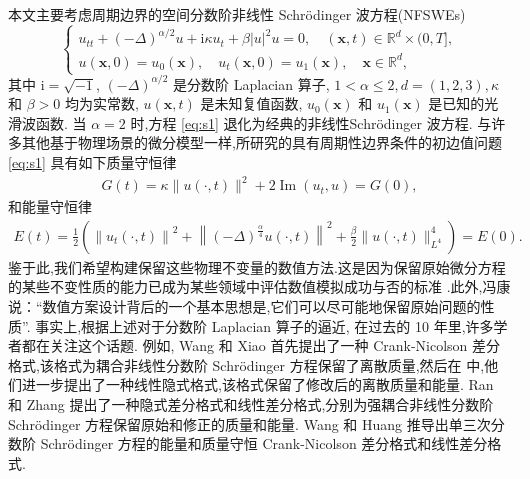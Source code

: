 本文主要考虑周期边界的空间分数阶非线性 Schr{\"o}dinger 波方程(NFSWEs)
\begin{equation}
    \left\{\begin{array}{l}
        u_{t t}+(-\Delta)^{\alpha / 2} u+\mathrm{i} \kappa u_{t}+\beta|u|^{2} u=0, \quad(\boldsymbol{x}, t) \in \mathbb{R}^d\times(0, T], \\
        u(\boldsymbol{x}, 0)=u_{0}(\boldsymbol{x}), \quad u_{t}(\boldsymbol{x}, 0)=u_{1}(\boldsymbol{x}), \quad \boldsymbol{x} \in \mathbb{R}^d,
    \end{array}\right.\label{eq:s1}
    \end{equation}
其中 $\mathrm{i}=\sqrt{-1}$, $(-\Delta)^{\alpha / 2}$ 是分数阶 Laplacian 算子, $1<\alpha \leq 2,d=(1,2,3), \kappa$ 和 $\beta>0$ 均为实常数, 
$u(\boldsymbol{x}, t)$ 是未知复值函数, $u_{0}(\boldsymbol{x})$ 和 $u_{1}(\boldsymbol{x})$ 是已知的光滑波函数. 
当 $\alpha=2$ 时,方程 \eqref{eq:s1} 退化为经典的非线性Schr{\"o}dinger 波方程. 与许多其他基于物理场景的微分模型一样,所研究的具有周期性边界条件的初边值问题 \eqref{eq:s1}  具有如下质量守恒律
\begin{align}\label{eq_8}
    G(t)=\kappa\|u(\cdot, t)\|^{2}+2\operatorname{Im}\left(u_{t}, u\right)=G(0),
    \end{align}
和能量守恒律
\begin{align}\label{eq_9}
    E(t)=\frac{1}{2}\left(\left\|u_{t}(\cdot, t)\right\|^{2}+\left\|(-\Delta)^{\frac{\alpha}{4}} u(\cdot, t)\right\|^{2}+\frac{\beta}{2}\|u(\cdot, t)\|_{L^{4}}^{4}\right)=E(0).
    \end{align}
鉴于此,我们希望构建保留这些物理不变量的数值方法.这是因为保留原始微分方程的某些不变性质的能力已成为某些领域中评估数值模拟成功与否的标准 \cite{liFiniteDifferenceCalculus1995}.此外,冯康说：“数值方案设计背后的一个基本思想是,它们可以尽可能地保留原始问题的性质”.
事实上,根据上述对于分数阶 Laplacian 算子的逼近, 在过去的 10 年里,许多学者都在关注这个话题. 
例如, Wang 和 Xiao \cite{wangCrankNicolsonDifference2013} 首先提出了一种 Crank-Nicolson 差分格式,该格式为耦合非线性分数阶 Schr{\"o}dinger 方程保留了离散质量,然后在 \cite{wangLinearlyImplicitConservative2014} 中,他们进一步提出了一种线性隐式格式,该格式保留了修改后的离散质量和能量. 
Ran 和 Zhang \cite{ranConservativeDifferenceScheme2016} 提出了一种隐式差分格式和线性差分格式,分别为强耦合非线性分数阶 Schr{\"o}dinger 方程保留原始和修正的质量和能量. 
Wang 和 Huang \cite{wangEnergyConservativeDifference2015,wangConservativeLinearizedDifference2015} 推导出单三次分数阶 Schr{\"o}dinger 方程的能量和质量守恒 Crank-Nicolson 差分格式和线性差分格式.
